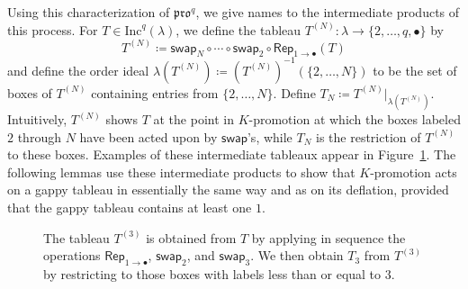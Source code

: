 \documentclass[12pt]{amsart}
\theoremstyle{definition}
\theoremstyle{remark}
\numberwithin{equation}{section}
\newcommand{\inc}{\ensuremath{\mathrm{Inc}}}
\newcommand{\pro}{\mathfrak{pro}}
\newcommand{\swap}{\ensuremath{\mathsf{swap}}}
\newcommand{\rep}{\ensuremath{\mathsf{Rep}}}
\begin{document}
Using this characterization of $\pro^q$, we give names to the intermediate products of this process.
For $T \in \inc^q(\lambda)$, we define the tableau $T^{(N)}: \lambda \rightarrow \lbrace 2, \dots, q, \bullet \rbrace$ by 
\[T^{(N)} \coloneqq \swap_N \circ \cdots \circ \swap_2 \circ \rep_{1 \rightarrow \bullet}(T)\] and define the order ideal $\lambda(T^{(N)}) \coloneqq \left( T^{(N)} \right)^{-1}(\{2,\dots,N\})$ to be the set of boxes of $T^{(N)}$ containing entries from $\{2,\dots,N\}$. Define $T_N \coloneqq T^{(N)} \vert_{\lambda(T^{(N)})}$. Intuitively, $T^{(N)}$ shows $T$ at the point in $K$-promotion at which the boxes labeled $2$ through $N$ have been acted upon by $\swap$'s, while $T_N$ is the restriction of $T^{(N)}$ to these boxes. Examples of these intermediate tableaux appear in Figure~\ref{fig:restricted_promotions}. The following lemmas use these intermediate products to show that $K$-promotion acts on a gappy tableau in essentially the same way and as on its deflation, provided that the gappy tableau contains at least one $1$. 

\begin{figure}[h]
\caption{The tableau $T^{(3)}$ is obtained from $T$ by applying in sequence the operations $\rep_{1 \rightarrow \bullet}$, $\swap_2$, and $\swap_3$. We then obtain $T_3$ from $T^{(3)}$ by restricting to those boxes with labels less than or equal to $3$.}\label{fig:restricted_promotions}
\end{figure}
\end{document}
